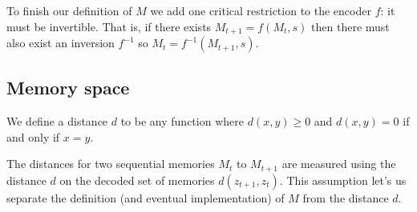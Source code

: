 To finish our definition of $M$ we add one critical restriction to the encoder $f$: it must be invertible. That is, if there exists $M_{t+1} = f(M_{t}, s)$ then there must also exist an inversion $f^{-1}$ so $M_{t} = f^{-1}(M_{t+1}, s)$. 

\subsection*{Memory space}
\begin{definition}
    \label{def:distance}
    We define a distance $d$ to be any function where $d(x,y) \geq 0$ and $d(x,y) = 0$ if and only if $x = y$.
\end{definition}
    
The distances for two sequential memories $M_{t}$ to $M_{t+1}$ are measured using the distance $d$ on the decoded set of memories $d(z_{t+1},z_{t})$. This assumption let's us separate the definition (and eventual implementation) of $M$ from the distance $d$.
    